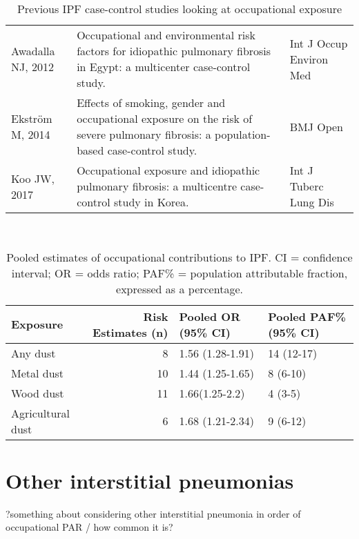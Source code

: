 \documentclass[a4
er,12pt]{article}
\begin{document}
\begin{table}
\begin{tabular}{p{5cm}p{7cm}p{3cm}}
                Awadalla NJ, 2012\cite{Awadalla2012} &  Occupational and environmental risk factors for idiopathic pulmonary fibrosis in Egypt: a multicenter case-control study. &     Int J Occup Environ Med \\
                  Ekström M, 2014\cite{Ekstrom2014} &  Effects of smoking, gender and occupational exposure on the risk of severe pulmonary fibrosis: a population-based case-control study. &                    BMJ Open \\ 
                     Koo JW, 2017\cite{Koo2017} &  Occupational exposure and idiopathic pulmonary fibrosis: a multicentre case-control study in Korea. &       Int J Tuberc Lung Dis \\
	\bottomrule
    \end{tabular}
	\caption{Previous IPF case-control studies looking at occupational exposure}
	\label{table:papers}
\end{table}
               

\

\begin{table}
    \begin{tabular}{lrll}
        \textbf{Exposure} &  \textbf{Risk Estimates (n)} & \textbf{Pooled OR (95\% CI)} & \textbf{Pooled PAF\% (95\% CI)} \\
              \midrule
               Any dust &  8 &  1.56 (1.28-1.91) &  14 (12-17) \\
               Metal dust &  10 &  1.44 (1.25-1.65) &  8 (6-10) \\
               Wood dust &  11 &  1.66(1.25-2.2) &  4 (3-5) \\
               Agricultural dust &  6 &  1.68 (1.21-2.34) &  9 (6-12) \\
               \bottomrule
    \end{tabular}
    \caption{Pooled estimates of occupational contributions to IPF. CI = confidence interval; OR = odds ratio; PAF\% = population attributable fraction, expressed as a percentage.}
    \label{table:ipfpooled}
\end{table}


\section{Other interstitial pneumonias}

?something about considering other interstitial pneumonia in order of occupational PAR / how common it is?
\end{document}
